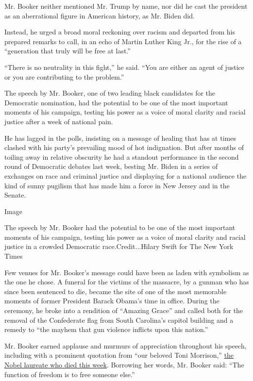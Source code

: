 Mr. Booker neither mentioned Mr. Trump by name, nor did he cast the
president as an aberrational figure in American history, as Mr. Biden
did.

Instead, he urged a broad moral reckoning over racism and departed from
his prepared remarks to call, in an echo of Martin Luther King Jr., for
the rise of a ``generation that truly will be free at last.''

``There is no neutrality in this fight,'' he said. ``You are either an
agent of justice or you are contributing to the problem.''

The speech by Mr. Booker, one of two leading black candidates for the
Democratic nomination, had the potential to be one of the most important
moments of his campaign, testing his power as a voice of moral clarity
and racial justice after a week of national pain.

He has lagged in the polls, insisting on a message of healing that has
at times clashed with his party's prevailing mood of hot indignation.
But after months of toiling away in relative obscurity he had a standout
performance in the second round of Democratic debates last week, besting
Mr. Biden in a series of exchanges on race and criminal justice and
displaying for a national audience the kind of sunny pugilism that has
made him a force in New Jersey and in the Senate.

Image

The speech by Mr. Booker had the potential to be one of the most
important moments of his campaign, testing his power as a voice of moral
clarity and racial justice in a crowded Democratic race.Credit...Hilary
Swift for The New York Times

Few venues for Mr. Booker's message could have been as laden with
symbolism as the one he chose. A funeral for the victims of the
massacre, by a gunman who has since been sentenced to die, became the
site of one of the most memorable moments of former President Barack
Obama's time in office. During the ceremony, he broke into a rendition
of ``Amazing Grace'' and called both for the removal of the Confederate
flag from South Carolina's capitol building and a remedy to ``the mayhem
that gun violence inflicts upon this nation.''

Mr. Booker earned applause and murmurs of appreciation throughout his
speech, including with a prominent quotation from ``our beloved Toni
Morrison,''
\href{https://www.nytimes.com/2019/08/06/books/toni-morrison-dead.html}{the
Nobel laureate who died this week}. Borrowing her words, Mr. Booker
said: ``The function of freedom is to free someone else.''

